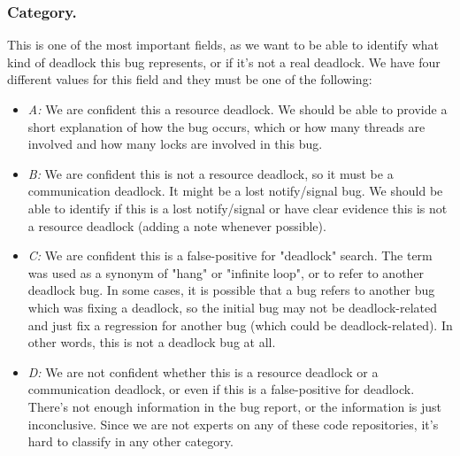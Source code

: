 \subsubsection{Category.}

This is one of the most important fields, as we want to be able to identify what kind of deadlock this bug represents, or if it's not a real deadlock. We have four different values for this field and they must be one of the following:

\begin{itemize}
\item \emph{A:} We are confident this a resource deadlock. We should be able to provide a short explanation of how the bug occurs, which or how many threads are involved and how many locks are involved in this bug.

\item \emph{B:} We are confident this is not a resource deadlock, so it must be a communication deadlock. It might be a lost notify/signal bug. We should be able to identify if this is a lost notify/signal or have clear evidence this is not a resource deadlock (adding a note whenever possible).

\item \emph{C:} We are confident this is a false-positive for "deadlock" search. The term was used as a synonym of "hang" or "infinite loop", or to refer to another deadlock bug. In some cases, it is possible that a bug refers to another bug which was fixing a deadlock, so the initial bug may not be deadlock-related and just fix a regression for another bug (which could be deadlock-related). In other words, this is not a deadlock bug at all.

\item \emph{D:} We are not confident whether this is a resource deadlock or a communication deadlock, or even if this is a false-positive for deadlock. There's not enough information in the bug report, or the information is just inconclusive. Since we are not experts on any of these code repositories, it's hard to classify in any other category.
\end{itemize}

